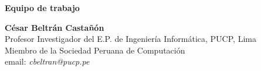 \begin{center}
{\bf \Huge Equipo de trabajo}
\end{center} 
\vspace{1cm}

% 

\begin{center}
\textbf{César Beltrán Castañón}\\
Profesor Investigador del E.P. de Ingeniería Informática, PUCP, Lima\\
Miembro de la Sociedad Peruana de Computación\\
email: \textit{cbeltran@pucp.pe}\\
\end{center}

\newpage
